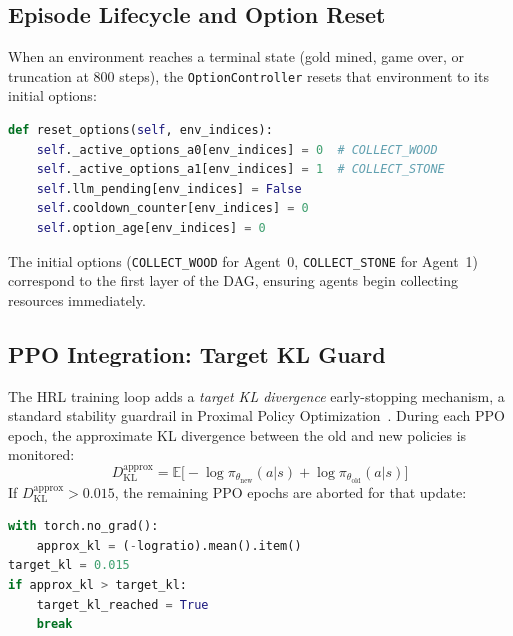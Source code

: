 \subsection{Episode Lifecycle and Option Reset}
\label{sec:episode_lifecycle}

When an environment reaches a terminal state (gold mined, game over,
or truncation at 800 steps), the \texttt{OptionController} resets
that environment to its initial options:

\begin{lstlisting}[style=code, language=Python, caption={Episode reset in \texttt{option\_controller.py}.}, label={lst:option_reset}]
def reset_options(self, env_indices):
    self._active_options_a0[env_indices] = 0  # COLLECT_WOOD
    self._active_options_a1[env_indices] = 1  # COLLECT_STONE
    self.llm_pending[env_indices] = False
    self.cooldown_counter[env_indices] = 0
    self.option_age[env_indices] = 0
\end{lstlisting}

The initial options (\texttt{COLLECT\_WOOD} for Agent~0,
\texttt{COLLECT\_STONE} for Agent~1) correspond to the first layer
of the DAG, ensuring agents begin collecting resources immediately.

\subsection{PPO Integration: Target KL Guard}
\label{sec:target_kl}

The HRL training loop adds a \emph{target KL divergence} early-stopping
mechanism, a standard stability guardrail in Proximal Policy Optimization~\parencite{Schulman_Wolski_Dhariwal_Radford_Klimov_2017}. During each PPO epoch, the approximate KL divergence
between the old and new policies is monitored:
\begin{equation}
\label{eq:approx_kl}
    D_{\text{KL}}^{\text{approx}}
    = \mathbb{E}\bigl[-\log \pi_{\theta_{\text{new}}}(a|s)
      + \log \pi_{\theta_{\text{old}}}(a|s)\bigr]
\end{equation}
If $D_{\text{KL}}^{\text{approx}} > 0.015$, the remaining PPO
epochs are aborted for that update:

\begin{lstlisting}[style=code, language=Python, caption={Target KL guard in \texttt{hrl\_train\_loop.py}.}, label={lst:target_kl}]
with torch.no_grad():
    approx_kl = (-logratio).mean().item()
target_kl = 0.015
if approx_kl > target_kl:
    target_kl_reached = True
    break
\end{lstlisting}

